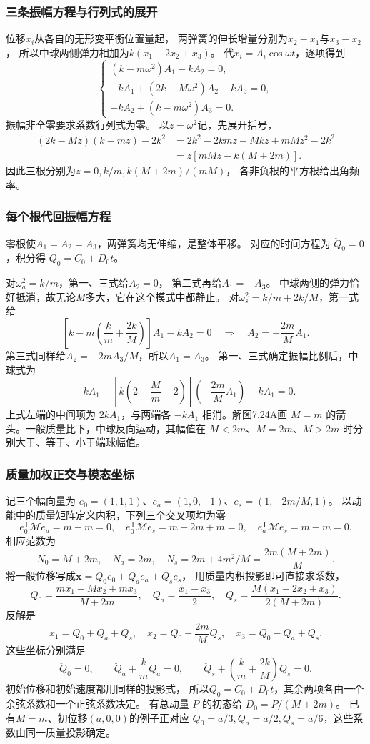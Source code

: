 \documentclass[UTF8,fontset=fandol,a4paper,11pt]{ctexart}
\begin{document}
\subsubsection*{三条振幅方程与行列式的展开}
位移$x_i$从各自的无形变平衡位置量起，
两弹簧的伸长增量分别为$x_2-x_1$与$x_3-x_2$，
所以中球两侧弹力相加为$k(x_1-2x_2+x_3)$。
代$x_i=A_i\cos\omega t$，逐项得到
\[
\begin{cases}
(k-m\omega^2)A_1-kA_2=0,\\
-kA_1+(2k-M\omega^2)A_2-kA_3=0,\\
-kA_2+(k-m\omega^2)A_3=0.
\end{cases}
\]
振幅非全零要求系数行列式为零。
以$z=\omega^2$记，先展开括号，
\[
\begin{aligned}
(2k-Mz)(k-mz)-2k^2
&=2k^2-2kmz-Mkz+mMz^2-2k^2\\
&=z[mMz-k(M+2m)].
\end{aligned}
\]
因此三根分别为$z=0,k/m,k(M+2m)/(mM)$，
各非负根的平方根给出角频率。

\subsubsection*{每个根代回振幅方程}
零根使$A_1=A_2=A_3$，两弹簧均无伸缩，是整体平移。
对应的时间方程为 $\ddot Q_0=0$，积分得 $Q_0=C_0+D_0t$。

对$\omega_a^2=k/m$，第一、三式给$A_2=0$，
第二式再给$A_1=-A_3$。
中球两侧的弹力恰好抵消，故无论$M$多大，它在这个模式中都静止。
对$\omega_s^2=k/m+2k/M$，第一式给
\[
\left[k-m\left(\frac km+\frac{2k}{M}\right)\right]A_1-kA_2=0
\quad\Longrightarrow\quad A_2=-\frac{2m}{M}A_1.
\]
第三式同样给$A_2=-2mA_3/M$，所以$A_1=A_3$。
第一、三式确定振幅比例后，中球式为
\[
-kA_1+\left[k\left(2-\frac M m-2\right)\right]
\left(-\frac{2m}{M}A_1\right)-kA_1=0.
\]
上式左端的中间项为 $2kA_1$，与两端各 $-kA_1$ 相消。解图7.24A画 $M=m$ 的箭头。一般质量比下，中球反向运动，其幅值在 $M<2m$、$M=2m$、$M>2m$ 时分别大于、等于、小于端球幅值。

\subsubsection*{质量加权正交与模态坐标}
记三个幅向量为
$e_0=(1,1,1)$、$e_a=(1,0,-1)$、$e_s=(1,-2m/M,1)$。
以动能中的质量矩阵定义内积，下列三个交叉项均为零
\[
e_0^{\mathsf T}\mathcal M e_a=m-m=0,
\quad e_0^{\mathsf T}\mathcal M e_s=m-2m+m=0,
\quad e_a^{\mathsf T}\mathcal M e_s=m-m=0.
\]
相应范数为
\[
N_0=M+2m,\quad N_a=2m,\quad
N_s=2m+4m^2/M=\frac{2m(M+2m)}M.
\]
将一般位移写成$\boldsymbol x=Q_0e_0+Q_ae_a+Q_se_s$，
用质量内积投影即可直接求系数，
\[
Q_0=\frac{mx_1+Mx_2+mx_3}{M+2m},\quad
Q_a=\frac{x_1-x_3}{2},\quad
Q_s=\frac{M(x_1-2x_2+x_3)}{2(M+2m)}.
\]
反解是
\[
x_1=Q_0+Q_a+Q_s,\quad
x_2=Q_0-\frac{2m}{M}Q_s,\quad
x_3=Q_0-Q_a+Q_s.
\]
这些坐标分别满足
\[
\ddot Q_0=0,\qquad
\ddot Q_a+\frac kmQ_a=0,\qquad
\ddot Q_s+\left(\frac km+\frac{2k}{M}\right)Q_s=0.
\]
初始位移和初始速度都用同样的投影式，
所以$Q_0=C_0+D_0t$，其余两项各由一个余弦系数和一个正弦系数决定。
有总动量 $P$ 的初态给 $D_0=P/(M+2m)$。
已有$M=m$、初位移$(a,0,0)$的例子正对应
$Q_0=a/3,Q_a=a/2,Q_s=a/6$，这些系数由同一质量投影确定。
\end{document}
